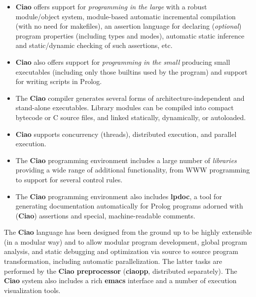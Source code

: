 \documentclass{article}
\newcommand{\inbf}[1]{{\bf #1}}
\newcommand{\enfat}[1]{{\em #1}}
\newcommand{\apl}[1]{{\bf #1}}
\begin{document}
\begin{itemize} 

\item \inbf{Ciao} offers support for \enfat{programming in the large} with
      a robust module/object system, module-based automatic
      incremental compilation (with no need for makefiles), an
      assertion language for declaring (\enfat{optional}) program
      properties (including types and modes), automatic static
      inference and static/dynamic checking of such assertions, etc.

\item \inbf{Ciao} also offers support for \enfat{programming in the small}
      producing small executables (including only those builtins used
      by the program) and support for writing scripts in Prolog.

\item The \inbf{Ciao} compiler generates several forms of
      architecture-independent and stand-alone executables.  Library
      modules can be compiled into compact bytecode or C source files,
      and linked statically, dynamically, or autoloaded.

\item \inbf{Ciao} supports concurrency (threads), distributed execution,
      and parallel execution.

\item The \inbf{Ciao} programming environment includes a large number of
      \enfat{libraries} providing a wide range of additional
      functionality, from WWW programming to support for several
      control rules.

\item The \inbf{Ciao} programming environment also includes
      \apl{lpdoc}, a tool for generating documentation automatically
      for Prolog programs adorned with (\inbf{Ciao}) assertions and
      special, machine-readable comments.

\end{itemize}

The \inbf{Ciao} language has been designed from the ground up to be
highly extensible (in a modular way) and to allow modular program
development, global program analysis, and static debugging and
optimization via source to source program transformation, including
automatic parallelization.  The latter tasks are performed by the
\inbf{Ciao preprocessor} (\apl{ciaopp}, distributed separately). The
\inbf{Ciao} system also includes a rich \apl{emacs} interface and a
number of execution visualization tools.
\end{document}
